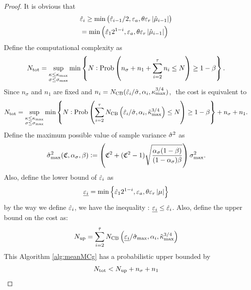 \documentclass{iitthesis}
\begin{document}
\begin{proof}
It is obvious that
\begin{align}
&\hat{\varepsilon}_i \geq  \min\left(\hat{\varepsilon}_{i-1}/2, \varepsilon_a, \theta\varepsilon_r\left \lvert \hat{\mu}_{i-1} \right \rvert\right)\\
& = \min\left(\hat{\varepsilon}_12^{1-i}, \varepsilon_a, \theta\varepsilon_r\left \lvert \hat{\mu}_{i-1} \right \rvert\right)\\
\end{align}
Define the computational complexity as
\begin{equation*}
N_{\text{tot}} = \sup_{\substack{\kappa \le \kappa_{\max} \\ \sigma \le \sigma_{\max}}} \min\left\{N : \operatorname{Prob}\left(n_{\sigma} + n_1+\sum_{i=2}^\tau n_i \le N\right) \ge 1-\beta  \right \}.
\end{equation*}
Since $n_\sigma$ and $n_1$ are fixed and $n_i =  N_{\text{CB}}(\hat{\varepsilon}_{i}/\hat{\sigma},\alpha_{i},\kappa_{\max}^{3/4})$, $ $ the cost is equivalent to 
\begin{equation*}
N_{\text{tot}} = \sup_{\substack{\kappa \le \kappa_{\max} \\ \sigma \le \sigma_{\max}}} \min\left\{N : \operatorname{Prob}\left(\sum_{i=2}^\tau N_{\text{CB}}\left(\hat{\varepsilon}_i/\hat{\sigma},\alpha_i,\tilde\kappa_{\max}^{3/4}\right) \le N\right) \ge 1-\beta  \right \}+n_{\sigma} + n_1.
\end{equation*}
Define the maximum possible value of sample variance $\hat{\sigma}^2$ as
\begin{align}\label{sigmax}
\hat{\sigma}_{\max}^2 (\mathfrak{C}, \alpha_{\sigma},\beta) := \left(\mathfrak{C}^2+(\mathfrak{C}^2-1)\sqrt{\frac{\alpha_{\sigma}(1-\beta)}{(1-\alpha_{\sigma})\beta}}\right)\sigma_{\max}^2.
\end{align}
Also, define the lower bound of $\hat{\varepsilon}_i$ as
\begin{align}
  \underline{\varepsilon_i} = \min \left \{ \hat{\varepsilon}_12^{1-i},\varepsilon_a, \theta\varepsilon_r\left \lvert \mu \right \rvert \right \}
\end{align}
by the way we define $\hat{\varepsilon}_i$, we have the inequality : $\underline{\varepsilon_i}\leq \hat{\varepsilon}_i$.
Also, define the upper bound on the cost as:
$$N_{\operatorname{up}} = \sum_{i=2}^{\bar{\tau}} N_{\text{CB}}\left(\underline{\varepsilon_i} /\hat{\sigma}_{\max},\alpha_i,\tilde\kappa_{\max}^{3/4}\right)$$
This Algorithm \ref{alg:meanMCg} has a probabilistic upper bounded by
\begin{align}
N_{\text{tot}} < N_{\operatorname{up}}+n_\sigma+n_1
\end{align}
\end{proof}
\end{document}
